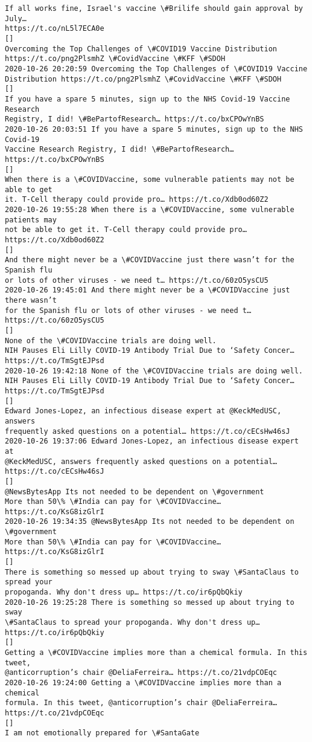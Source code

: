 \documentclass[11pt]{article}
\begin{document}
\begin{Verbatim}[commandchars=\\\{\}]
If all works fine, Israel's vaccine \#Brilife should gain approval by July…
https://t.co/nL5l7ECA0e
[]
Overcoming the Top Challenges of \#COVID19 Vaccine Distribution
https://t.co/png2PlsmhZ \#CovidVaccine \#KFF \#SDOH
2020-10-26 20:20:59 Overcoming the Top Challenges of \#COVID19 Vaccine
Distribution https://t.co/png2PlsmhZ \#CovidVaccine \#KFF \#SDOH
[]
If you have a spare 5 minutes, sign up to the NHS Covid-19 Vaccine Research
Registry, I did! \#BePartofResearch… https://t.co/bxCPOwYnBS
2020-10-26 20:03:51 If you have a spare 5 minutes, sign up to the NHS Covid-19
Vaccine Research Registry, I did! \#BePartofResearch… https://t.co/bxCPOwYnBS
[]
When there is a \#COVIDVaccine, some vulnerable patients may not be able to get
it. T-Cell therapy could provide pro… https://t.co/Xdb0od60Z2
2020-10-26 19:55:28 When there is a \#COVIDVaccine, some vulnerable patients may
not be able to get it. T-Cell therapy could provide pro… https://t.co/Xdb0od60Z2
[]
And there might never be a \#COVIDVaccine just there wasn’t for the Spanish flu
or lots of other viruses - we need t… https://t.co/60zO5ysCU5
2020-10-26 19:45:01 And there might never be a \#COVIDVaccine just there wasn’t
for the Spanish flu or lots of other viruses - we need t…
https://t.co/60zO5ysCU5
[]
None of the \#COVIDVaccine trials are doing well.
NIH Pauses Eli Lilly COVID-19 Antibody Trial Due to ‘Safety Concer…
https://t.co/TmSgtEJPsd
2020-10-26 19:42:18 None of the \#COVIDVaccine trials are doing well.
NIH Pauses Eli Lilly COVID-19 Antibody Trial Due to ‘Safety Concer…
https://t.co/TmSgtEJPsd
[]
Edward Jones-Lopez, an infectious disease expert at @KeckMedUSC, answers
frequently asked questions on a potential… https://t.co/cECsHw46sJ
2020-10-26 19:37:06 Edward Jones-Lopez, an infectious disease expert at
@KeckMedUSC, answers frequently asked questions on a potential…
https://t.co/cECsHw46sJ
[]
@NewsBytesApp Its not needed to be dependent on \#government
More than 50\% \#India can pay for \#COVIDVaccine… https://t.co/KsG8izGlrI
2020-10-26 19:34:35 @NewsBytesApp Its not needed to be dependent on \#government
More than 50\% \#India can pay for \#COVIDVaccine… https://t.co/KsG8izGlrI
[]
There is something so messed up about trying to sway \#SantaClaus to spread your
propoganda. Why don't dress up… https://t.co/ir6pQbQkiy
2020-10-26 19:25:28 There is something so messed up about trying to sway
\#SantaClaus to spread your propoganda. Why don't dress up…
https://t.co/ir6pQbQkiy
[]
Getting a \#COVIDVaccine implies more than a chemical formula. In this tweet,
@anticorruption’s chair @DeliaFerreira… https://t.co/21vdpCOEqc
2020-10-26 19:24:00 Getting a \#COVIDVaccine implies more than a chemical
formula. In this tweet, @anticorruption’s chair @DeliaFerreira…
https://t.co/21vdpCOEqc
[]
I am not emotionally prepared for \#SantaGate


\end{Verbatim}
\end{document}
